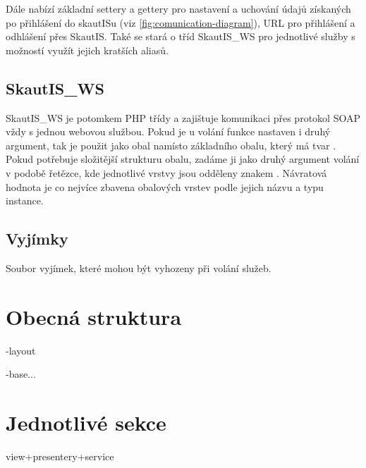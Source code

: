 \documentclass[thesis=B,czech]{FITthesis}[2011/06/14]
\begin{document}
Dále nabízí základní settery a gettery pro nastavení a uchování údajů získaných po přihlášení do skautISu (viz \ref{fig:comunication-diagram}), URL pro přihlášení a odhlášení přes SkautIS. Také se stará o  tříd SkautIS\_WS pro jednotlivé služby s možností využít jejich kratších aliasů. 

\subsection{SkautIS\_WS}
SkautIS\_WS je potomkem PHP třídy  a zajištuje komunikaci přes protokol SOAP vždy s jednou webovou službou. Pokud je u volání funkce nastaven i druhý argument, tak je použit jako obal namísto základního obalu, který má tvar . Pokud potřebuje složitější strukturu obalu, zadáme ji jako druhý argument volání v podobě řetězce, kde jednotlivé vrstvy jsou odděleny znakem \uv{/}. Návratová hodnota je co nejvíce zbavena obalových vrstev podle jejich názvu a typu instance.

\subsection{Vyjímky}
Soubor vyjímek, které mohou být vyhozeny při volání služeb.  

\section{Obecná struktura}
-layout

-base...

\section{Jednotlivé sekce}
view+presentery+service
\subsection{}

\subsection{}



\begin{conclusion}
\end{conclusion}



\end{document}
